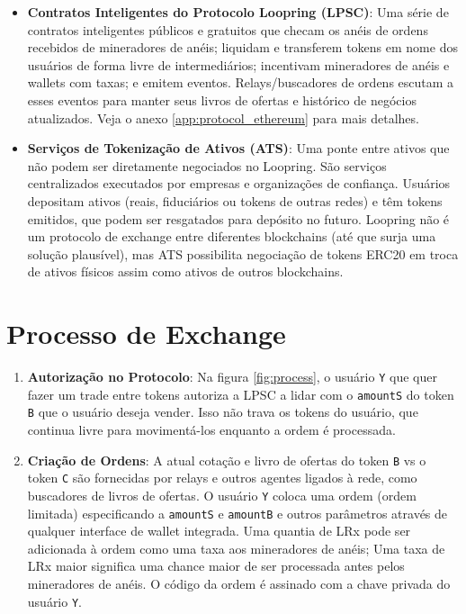 \documentclass[UTF8,nofonts]{article}
\begin{document}
\begin{multicols}{2}
\begin{itemize}
	\item \textbf{Contratos Inteligentes do Protocolo Loopring (LPSC)}: Uma série de contratos inteligentes públicos e gratuitos que checam os anéis de ordens recebidos de mineradores de anéis; liquidam e transferem tokens em nome dos usuários de forma livre de intermediários; incentivam mineradores de anéis e wallets com taxas; e emitem eventos. Relays/buscadores de ordens escutam a esses eventos para manter seus livros de ofertas e histórico de negócios atualizados. Veja o anexo \ref{app:protocol_ethereum} para mais detalhes.
	\item \textbf{Serviços de Tokenização de Ativos (ATS)}: Uma ponte entre ativos que não podem ser diretamente negociados no Loopring. São serviços centralizados executados por empresas e organizações de confiança. Usuários depositam ativos (reais, fiduciários ou tokens de outras redes) e têm tokens emitidos, que podem ser resgatados para depósito no futuro. Loopring não é um protocolo de exchange entre diferentes blockchains (até que surja uma solução plausível), mas ATS possibilita negociação de tokens ERC20 \cite{ERC20} em troca de ativos físicos assim como ativos de outros blockchains.
\end{itemize}

\section{Processo de Exchange\label{sec:process}}

\begin{enumerate} 
\item \textbf{Autorização no Protocolo}: Na figura \ref{fig:process}, o usuário \verb|Y| que quer fazer um trade entre tokens autoriza a LPSC a lidar com o \verb|amountS| do token \verb|B| que o usuário deseja vender. Isso não trava os tokens do usuário, que continua livre para movimentá-los enquanto a ordem é processada.

\item \textbf{Criação de Ordens}: A atual cotação e livro de ofertas do token \verb|B| vs o token \verb|C| são fornecidas por relays e outros agentes ligados à rede, como buscadores de livros de ofertas. O usuário \verb|Y| coloca uma ordem (ordem limitada) especificando a \verb|amountS| e \verb|amountB| e outros parâmetros através de qualquer interface de wallet integrada. Uma quantia de LRx pode ser adicionada à ordem como uma taxa aos mineradores de anéis; Uma taxa de LRx maior significa uma chance maior de ser processada antes pelos mineradores de anéis. O código da ordem é assinado com a chave privada do usuário \verb|Y|. 


\end{enumerate}
\end{multicols}
\end{document}
